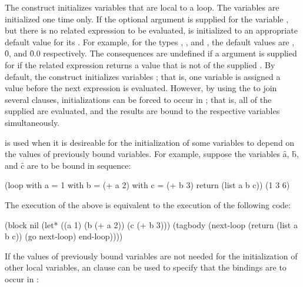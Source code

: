 The  construct initializes variables that are local to 
a loop.  The variables are initialized one time only.
If the optional  argument is supplied for the variable 
, but there is no related expression to be evaluated, 
is initialized to an appropriate default value for its .
For example, for the types , , 
and ,
the default values are \nil, \f{0}, and \f{0.0} respectively.
The consequences are undefined if a 
 argument is supplied for  if
the related expression returns a value that is not of the supplied 
.
By default, the  construct initializes variables
; that is, one variable is assigned a value before the
next expression is evaluated.  However, by using the  
to join several  clauses, 
initializations can be forced to occur in ; that 
is, all of the supplied
 are evaluated, and the results are bound to the respective
variables simultaneously.

  is used when it is desireable for the initialization of
some variables to depend on the values of previously bound variables.
For example, suppose the variables \f{a}, \f{b}, and \f{c} are to be bound in sequence:
 
\code
 (loop with a = 1 
       with b = (+ a 2) 
       with c = (+ b 3)
       return (list a b c))
\EV (1 3 6)
\endcode
 
The execution of the above  is equivalent to the execution of
the following code:
 
\code
 (block nil
   (let* ((a 1)
          (b (+ a 2))
          (c (+ b 3)))
     (tagbody
         (next-loop (return (list a b c))
                    (go next-loop)
                    end-loop))))
\endcode
{}

If the values of previously bound variables are not needed
for the initialization of other local variables, an 
 clause can be used to 
specify that the bindings are to occur in :
 
